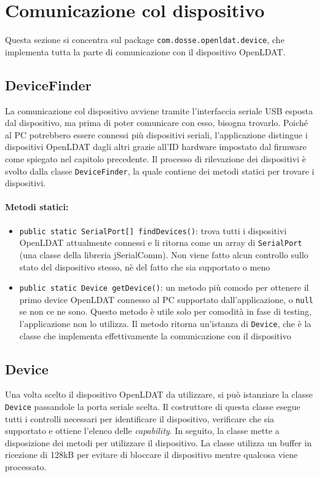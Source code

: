 \section{Comunicazione col dispositivo}
Questa sezione si concentra sul package \texttt{com.dosse.openldat.device}, che implementa tutta la parte di comunicazione con il dispositivo OpenLDAT.

\subsection{DeviceFinder}
La comunicazione col dispositivo avviene tramite l'interfaccia seriale USB esposta dal dispositivo, ma prima di poter comunicare con esso, bisogna trovarlo. Poiché al PC potrebbero essere connessi più dispositivi seriali, l'applicazione distingue i dispositivi OpenLDAT dagli altri grazie all'ID hardware impostato dal firmware come spiegato nel capitolo precedente.
Il processo di rilevazione dei dispositivi è svolto dalla classe \texttt{DeviceFinder}, la quale contiene dei metodi statici per trovare i dispositivi.

\paragraph{Metodi statici:}\begin{itemize}
	\item \texttt{public static SerialPort[] findDevices()}: trova tutti i dispositivi OpenLDAT attualmente connessi e li ritorna come un array di \texttt{SerialPort} (una classe della libreria jSerialComm). Non viene fatto alcun controllo sullo stato del dispositivo stesso, nè del fatto che sia supportato o meno
	\item \texttt{public static Device getDevice()}: un metodo più comodo per ottenere il primo device OpenLDAT connesso al PC supportato dall'applicazione, o \texttt{null} se non ce ne sono. Questo metodo è utile solo per comodità in fase di testing, l'applicazione non lo utilizza. Il metodo ritorna un'istanza di \texttt{Device}, che è la classe che implementa effettivamente la comunicazione con il dispositivo
\end{itemize}

\subsection{Device}
Una volta scelto il dispositivo OpenLDAT da utilizzare, si può istanziare la classe \texttt{Device} passandole la porta seriale scelta. Il costruttore di questa classe esegue tutti i controlli necessari per identificare il dispositivo, verificare che sia supportato e ottiene l'elenco delle \textit{capability}. In seguito, la classe mette a disposizione dei metodi per utilizzare il dispositivo. La classe utilizza un buffer in ricezione di 128kB per evitare di bloccare il dispositivo mentre qualcosa viene processato.

